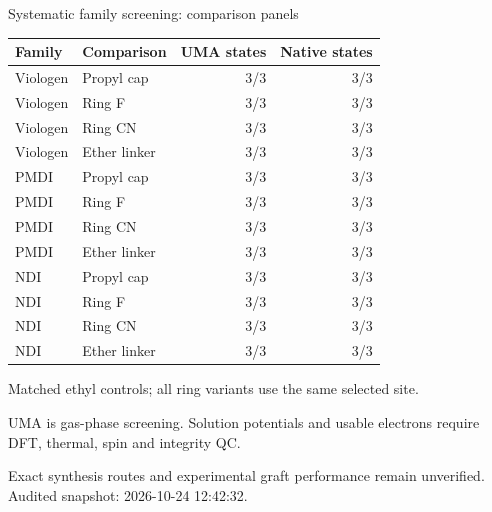 \begin{frame}{Systematic family screening: comparison panels}
\scriptsize\centering\renewcommand{\arraystretch}{1.05}
\begin{tabular}{@{}llrr@{}}\toprule
Family & Comparison & UMA states & Native states \\ \midrule
Viologen & Propyl cap & 3/3 & 3/3 \\
Viologen & Ring F & 3/3 & 3/3 \\
Viologen & Ring CN & 3/3 & 3/3 \\
Viologen & Ether linker & 3/3 & 3/3 \\
PMDI & Propyl cap & 3/3 & 3/3 \\
PMDI & Ring F & 3/3 & 3/3 \\
PMDI & Ring CN & 3/3 & 3/3 \\
PMDI & Ether linker & 3/3 & 3/3 \\
NDI & Propyl cap & 3/3 & 3/3 \\
NDI & Ring F & 3/3 & 3/3 \\
NDI & Ring CN & 3/3 & 3/3 \\
NDI & Ether linker & 3/3 & 3/3 \\
\bottomrule\end{tabular}\par\vspace{1ex}\raggedright
\footnotesize Matched ethyl controls; all ring variants use the same selected site.
\par\vspace{1ex}UMA is gas-phase screening. Solution potentials and usable electrons require DFT, thermal, spin and integrity QC.
\par\vspace{1ex}Exact synthesis routes and experimental graft performance remain unverified.
\vfill\scriptsize Audited snapshot: 2026-10-24 12:42:32.
\end{frame}
